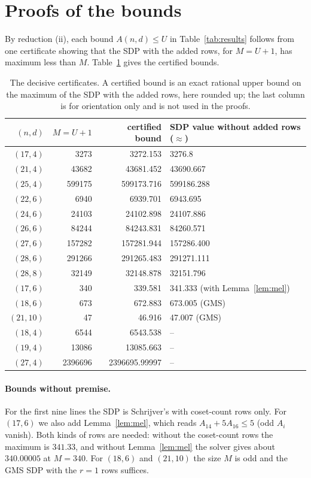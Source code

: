 \documentclass[11pt]{article}
\theoremstyle{remark}
\begin{document}
\section{Proofs of the bounds}

By reduction (ii), each bound $A(n,d)\le U$ in Table~\ref{tab:results} follows from one certificate showing that the
SDP with the added rows, for $M=U+1$, has maximum less than $M$. Table~\ref{tab:certs} gives the certified bounds.

\begin{table}[ht]
\centering
\begin{tabular}{rrrl}
\toprule
$(n,d)$ & $M=U+1$ & certified bound & SDP value without added rows ($\approx$) \\
\midrule
$(17,4)$ & 3273 & 3272.153 & 3276.8 \\
$(21,4)$ & 43682 & 43681.452 & 43690.667 \\
$(25,4)$ & 599175 & 599173.716 & 599186.288 \\
$(22,6)$ & 6940 & 6939.701 & 6943.695 \\
$(24,6)$ & 24103 & 24102.898 & 24107.886 \\
$(26,6)$ & 84244 & 84243.831 & 84260.571 \\
$(27,6)$ & 157282 & 157281.944 & 157286.400 \\
$(28,6)$ & 291266 & 291265.483 & 291271.111 \\
$(28,8)$ & 32149 & 32148.878 & 32151.796 \\
$(17,6)$ & 340 & 339.581 & 341.333 (with Lemma~\ref{lem:mel}) \\
$(18,6)$ & 673 & 672.883 & 673.005 (GMS) \\
$(21,10)$ & 47 & 46.916 & 47.007 (GMS) \\
$(18,4)$ & 6544 & 6543.538 & -- \\
$(19,4)$ & 13086 & 13085.663 & -- \\
$(27,4)$ & 2396696 & 2396695.99997 & -- \\
\bottomrule
\end{tabular}
\caption{The decisive certificates. A certified bound is an exact rational upper bound on the maximum of the SDP
with the added rows, here rounded up; the last column is
for orientation only and is not used in the proofs.}
\label{tab:certs}
\end{table}

\paragraph{Bounds without premise.} For the first nine lines the SDP is Schrijver's with coset-count rows only.
For $(17,6)$ we also add Lemma~\ref{lem:mel}, which reads $A_{14}+5A_{16}\le5$ (odd $A_i$ vanish). Both kinds of
rows are needed: without the coset-count rows the maximum is $341.33$, and without Lemma~\ref{lem:mel} the solver
gives about $340.00005$ at $M=340$.
For $(18,6)$ and $(21,10)$ the size $M$ is odd and the GMS SDP with the $r=1$ rows suffices.
\end{document}
